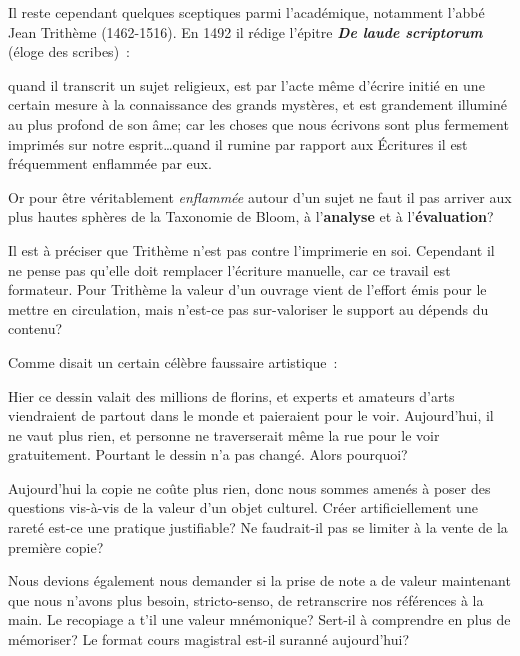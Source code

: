Il reste cependant quelques sceptiques parmi l'académique, notamment l'abbé Jean Trithème (1462-1516). En 1492 il rédige l'épitre \textbf{\emph{De laude scriptorum}} (éloge des scribes)~:

\begin{coolquote} quand il transcrit un sujet religieux, est par l'acte même d'écrire initié en une certain mesure à la connaissance des grands mystères, et est grandement illuminé au plus profond de son âme; car les choses que nous écrivons sont plus fermement imprimés sur notre esprit\ldots quand il rumine par rapport aux Écritures il est fréquemment enflammée par eux.
\end{coolquote}

Or pour être véritablement \emph{enflammée} autour d'un sujet ne faut il pas arriver aux plus hautes sphères de la Taxonomie de Bloom, à l'\textbf{analyse} et à l'\textbf{évaluation}?

Il est à préciser que Trithème n'est pas contre l'imprimerie en soi. Cependant il ne pense pas qu'elle doit remplacer l'écriture manuelle, car ce travail est formateur\cite{abbot-trithemius}. Pour Trithème la valeur d'un ouvrage vient de l'effort émis pour le mettre en circulation, mais n'est-ce pas sur-valoriser le support au dépends du contenu?

Comme disait un certain célèbre faussaire artistique~: 

\begin{coolquote}
Hier ce dessin valait des millions de florins, et experts et amateurs d'arts viendraient de partout dans le monde et paieraient pour le voir. Aujourd'hui, il ne vaut plus rien, et personne ne traverserait même la rue pour le voir gratuitement. Pourtant le dessin n'a pas changé. Alors pourquoi?
\end{coolquote}

Aujourd'hui la copie ne coûte plus rien, donc nous sommes amenés à poser des questions vis-à-vis de la valeur d'un objet culturel. Créer artificiellement une rareté est-ce une pratique justifiable? Ne faudrait-il pas se limiter à la vente de la première copie? 

Nous devions également nous demander si la prise de note a de valeur maintenant que nous n'avons plus besoin, stricto-senso, de retranscrire nos références à la main. Le recopiage a t'il une valeur mnémonique? Sert-il à comprendre en plus de mémoriser? Le format cours magistral est-il suranné aujourd'hui?  

